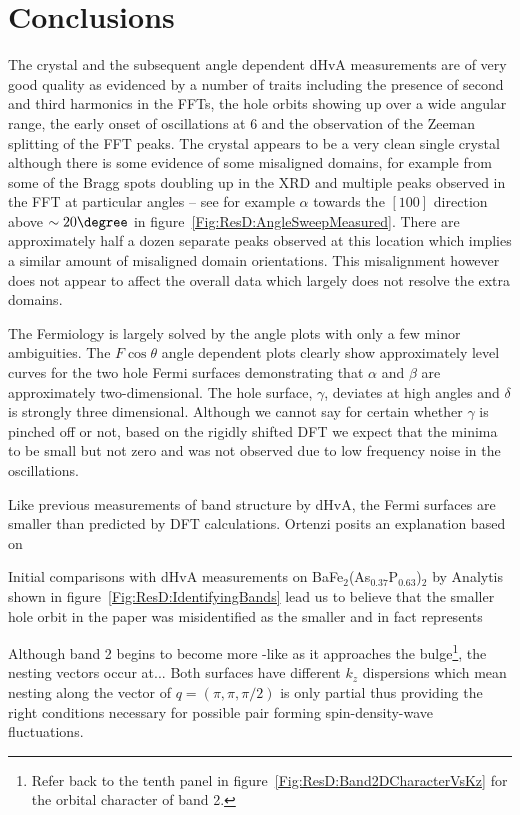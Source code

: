 
\section{Conclusions}

The \BaFeP crystal and the subsequent angle dependent \ac{dHvA} measurements are of very good quality as evidenced by a number of traits including the presence of second and third harmonics in the \acp{FFT}, the hole orbits showing up over a wide angular range, the early onset of oscillations at \unit{6}{\tesla} and the observation of the Zeeman splitting of the \ac{FFT} peaks. The crystal appears to be a very clean single crystal although there is some evidence of some misaligned domains, for example from some of the Bragg spots doubling up in the \ac{XRD} and multiple peaks observed in the \ac{FFT} at particular angles -- see for example $\alpha$ towards the $[100]$ direction above $\sim 20\degree$ in figure~\ref{Fig:ResD:AngleSweepMeasured}. There are approximately half a dozen separate peaks observed at this location which implies a similar amount of misaligned domain orientations. This misalignment however does not appear to affect the overall data which largely does not resolve the extra domains.

The Fermiology is largely solved by the angle plots with only a few minor ambiguities.  The $F\cos \theta$ angle dependent plots clearly show approximately level curves for the two hole Fermi surfaces demonstrating that $\alpha$ and $\beta$ are approximately two-dimensional. The hole surface, $\gamma$, deviates at high angles and $\delta$ is strongly three dimensional. Although we cannot say for certain whether $\gamma$ is pinched off or not, based on the rigidly shifted \ac{DFT} we expect that the minima to be small but not zero and was not observed due to low frequency noise in the oscillations.

Like previous measurements of band structure by \ac{dHvA}, the Fermi surfaces are smaller than predicted by \ac{DFT} calculations\cite{Shishido2010, Analytis2010c}. Ortenzi \etal\cite{Ortenzi2009} posits an explanation based on 


Initial comparisons with \ac{dHvA} measurements on BaFe$_2$(As$_{0.37}$P$_{0.63}$)$_2$ by Analytis \etal shown in figure~\ref{Fig:ResD:IdentifyingBands} lead us to believe that the smaller hole orbit in the paper was misidentified as the smaller and in fact represents


Although band 2 begins to become more \DzTwo-like as it approaches the bulge\footnote{Refer back to the tenth panel in figure~\ref{Fig:ResD:Band2DCharacterVsKz} for the orbital character of band 2.}, the nesting vectors occur at...
Both surfaces have different $k_z$ dispersions which mean nesting along the vector of $q=(\pi, \pi, \pi/2)$ is only partial thus providing the right conditions necessary for possible pair forming spin-density-wave fluctuations. 


